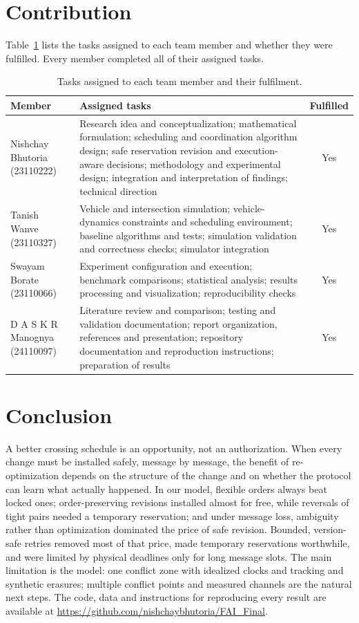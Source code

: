 \documentclass[10pt]{article}
\begin{document}
\section{Contribution}\label{sec:contrib}
Table~\ref{tab:contrib} lists the tasks assigned to each team member and whether they were fulfilled. Every member completed all of their assigned tasks.

\begin{table}[h]\centering\small
\caption{Tasks assigned to each team member and their fulfilment.}\label{tab:contrib}
\begin{tabularx}{\linewidth}{@{}l>{\raggedright\arraybackslash}Xc@{}}\toprule
Member & Assigned tasks & Fulfilled \\\midrule
Nishchay Bhutoria (23110222) & Research idea and conceptualization; mathematical formulation; scheduling and coordination algorithm design; safe reservation revision and execution-aware decisions; methodology and experimental design; integration and interpretation of findings; technical direction & Yes \\
Tanish Wanve (23110327) & Vehicle and intersection simulation; vehicle-dynamics constraints and scheduling environment; baseline algorithms and tests; simulation validation and correctness checks; simulator integration & Yes \\
Swayam Borate (23110066) & Experiment configuration and execution; benchmark comparisons; statistical analysis; results processing and visualization; reproducibility checks & Yes \\
D A S K R Manognya (24110097) & Literature review and comparison; testing and validation documentation; report organization, references and presentation; repository documentation and reproduction instructions; preparation of results & Yes \\\bottomrule
\end{tabularx}\end{table}

\section{Conclusion}
A better crossing schedule is an opportunity, not an authorization. When every change must be installed safely, message by message, the benefit of re-optimization depends on the structure of the change and on whether the protocol can learn what actually happened. In our model, flexible orders always beat locked ones; order-preserving revisions installed almost for free, while reversals of tight pairs needed a temporary reservation; and under message loss, ambiguity rather than optimization dominated the price of safe revision. Bounded, version-safe retries removed most of that price, made temporary reservations worthwhile, and were limited by physical deadlines only for long message slots. The main limitation is the model: one conflict zone with idealized clocks and tracking and synthetic erasures; multiple conflict points and measured channels are the natural next steps. The code, data and instructions for reproducing every result are available at \url{https://github.com/nishchaybhutoria/FAI_Final}.



\end{document}
